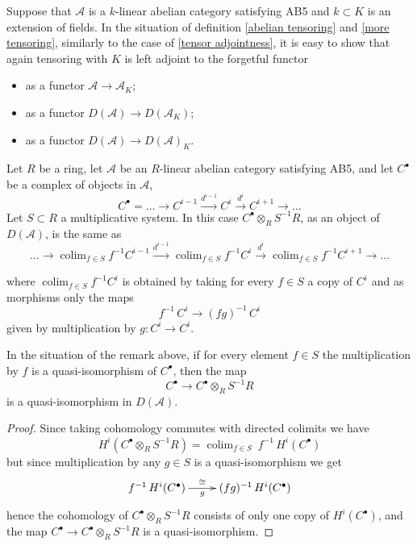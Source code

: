 \documentclass{amsart}
\begin{document}
\begin{remark}
Suppose that $\mathcal{A}$ is a $k$-linear abelian category satisfying AB5 and $k\subset K$ is an extension of fields. In the situation of definition \ref{abelian tensoring} and \ref{more tensoring}, similarly to the case of \ref{tensor adjointness}, it is easy to show that again tensoring with $K$ is left adjoint to the forgetful functor
\begin{itemize}
\item as a functor $\mathcal{A}\to \mathcal{A}_{K}$;
\item as a functor $D(\mathcal{A})\to D(\mathcal{A}_{K})$;
\item as a functor $D(\mathcal{A})\to D(\mathcal{A})_{K}$.
\end{itemize}
\end{remark}

\begin{remark}
Let $R$ be a ring, let $\mathcal{A}$ be an $R$-linear abelian category satisfying AB5, and let $C^{\bullet}$ be a complex of objects in $\mathcal{A}$,
$$C^{\bullet}=\ldots{\rightarrow} C^{i-1}\xrightarrow{d^{i-1}} C^{i} \xrightarrow{d^{i}} C^{i+1}{\rightarrow}\ldots$$
Let $S\subset R$ a multiplicative system. In this case $C^{\bullet}\otimes_{R}S^{-1}R$, as an object of $D(\mathscr{A})$, is the same as
$$\ldots{\rightarrow} \mathop{\mathrm{colim}}_{f\in S}f^{-1}C^{i-1}\xrightarrow{d^{i-1}} \mathop{\mathrm{colim}}_{f\in S}f^{-1}C^{i} \xrightarrow{d^{i}} \mathop{\mathrm{colim}}_{f\in S}f^{-1} C^{i+1}{\rightarrow}\ldots$$

where $\mathop{\mathrm{colim}}_{f\in S}f^{-1}C^{i}$ is obtained by taking for every $f \in S$ a copy of $C^{i}$
and as morphisms only the maps
$$
f^{-1}\,C^i
\longrightarrow
(fg)^{-1}\,C^i
$$
given by multiplication by $g: C^{i} \to C^{i}$.
\end{remark}

\begin{lemma}\label{tensor}
In the situation of the remark above, if for every element $f\in S$ the multiplication by $f$ is a quasi-isomorphism of $C^{\bullet}$, then the map $$C^{\bullet}{\rightarrow} C^{\bullet}\otimes_{R}S^{-1}R$$
is a quasi-isomorphism in $D(\mathcal{A})$.
\end{lemma}
\begin{proof}
Since taking cohomology commutes with directed colimits we have 
$$H^{i}(C^\bullet \otimes_{R} S^{-1}R)= \mathop{\text{colim}}_{f\in S}\ f^{-1}\,H^{i}(C^\bullet)$$
but since multiplication by any $g\in S$ is a quasi-isomorphism we get
$$\xymatrix{
f^{-1}\,H^{i}(C^{\bullet})\ar[r]^-{\cong}_-{g} & (fg)^{-1}\,H^{i}(C^{\bullet})
}$$
hence the cohomology of $C^\bullet \otimes_{R} S^{-1}R$ consists of only one copy of $H^{i}(C^{\bullet})$, and the map $C^{\bullet}{\rightarrow} C^\bullet \otimes_{R} S^{-1}R$ is a quasi-isomorphism.
\end{proof}
\end{document}
